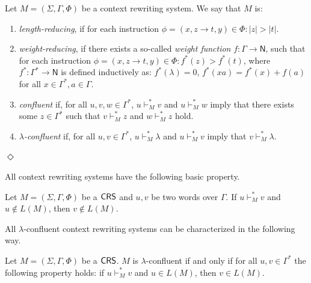 \begin{definition}
Let  $M = (\Sigma, \Gamma, \Phi)$ be a context rewriting system. We say that $M$ is:
\begin{enumerate}
\item \emph{length-reducing}, if for each instruction $\phi = (x, z \to t, y) \in \Phi: |z| > |t|$.

\item \emph{weight-reducing}, if there exists a so-called \emph{weight function} $f: \Gamma \to \mathsf{N}$, such that for each instruction $\phi = (x, z \to t, y) \in \Phi: f^*(z) > f^*(t)$, where $f^*: \Gamma^* \to \mathsf{N}$ is defined inductively as: $f^*(\lambda) = 0$, $f^*(xa) = f^*(x) + f(a)$ for all $x \in \Gamma^*, a \in \Gamma$.

\item \emph{confluent} if, for all $u, v, w \in \Gamma^*$, $u \vdash_M^* v$ and $u \vdash_M^* w$ imply that there exists some $z \in \Gamma^*$ such that $v \vdash_M^* z$ and $w \vdash_M^* z$ hold.

\item \emph{$\lambda$-confluent} if, for all $u, v \in \Gamma^*$, $u \vdash_M^* \lambda$ and $u \vdash_M^* v$ imply that $v \vdash_M^* \lambda$.

\end{enumerate}
\hfill$\Diamond$
\end{definition}

All context rewriting systems have the following basic property.

\begin{lemma}\label{lemma:error-preserving}
Let $M=(\Sigma, \Gamma, \Phi)$ be a $\mbox{\sf CRS\/}$ and $u, v$ be two words over $\Gamma$. 
If $u \vdash_M^* v$ and $u \not\in L(M)$, then $v \not\in L(M)$.
\end{lemma}

All $\lambda$-confluent context rewriting systems can be characterized in the following way.

\begin{lemma}\label{lemma:correctness-preserving}
Let $M=(\Sigma, \Gamma, \Phi)$ be a $\mbox{\sf CRS\/}$. $M$ is $\lambda$-confluent if and only if for all $u, v \in \Gamma^*$ the following property holds: if $u \vdash_M^* v$ and $u \in L(M)$, then $v \in L(M)$.
\end{lemma}

